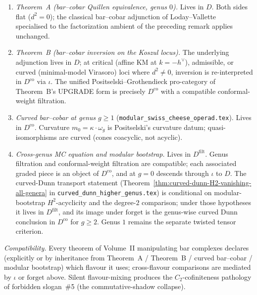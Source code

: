 \begin{remark}
\begin{enumerate}[label=\textup{(\roman*)}]
\item \emph{Theorem~A (bar--cobar Quillen equivalence, genus
 $0$).} Lives in $D$. Both sides flat ($d^2 = 0$); the classical
 bar--cobar adjunction of Loday--Vallette~\cite{LV12} specialised
 to the factorization ambient of the preceding remark applies
 unchanged.
\item \emph{Theorem~B (bar--cobar inversion on the Koszul
 locus).} The underlying adjunction lives in $D$; at critical
 (affine KM at $k = -h^\vee$), admissible, or curved
 (minimal-model Virasoro) loci where $d^2 \neq 0$, inversion is
 re-interpreted in $D^{\mathrm{co}}$ via $\iota$. The unified
 Positselski--Grothendieck pro-category of Theorem~B's UPGRADE
 form is precisely $D^{\mathrm{co}}$ with a compatible
 conformal-weight filtration.
\item \emph{Curved bar--cobar at genus $g \ge 1$}
 (\texttt{modular\_swiss\_cheese\_operad.tex}).
 Lives in $D^{\mathrm{co}}$. Curvature
 $m_0 = \kappa \cdot \omega_g$ is Positselski's curvature datum;
 quasi-isomorphisms are curved (cones coacyclic, not acyclic).
\item \emph{Cross-genus MC equation and modular bootstrap.} Lives
 in $D^{\mathrm{filt}}$. Genus filtration and conformal-weight
 filtration are compatible; each associated graded piece is an
 object of $D^{\mathrm{co}}$, and at $g = 0$ descends through
 $\iota$ to $D$. The curved-Dunn transport statement
 (Theorem~\ref*{thm:curved-dunn-H2-vanishing-all-genera} in
 \texttt{curved\_dunn\_higher\_genus.tex}) is conditional on
 modular-bootstrap \(H^2\)-acyclicity and the degree-\(2\)
 comparison; under those hypotheses it lives in
 $D^{\mathrm{filt}}$, and its image under $\mathrm{forget}$ is the
 genus-wise curved Dunn conclusion in $D^{\mathrm{co}}$ for
 \(g\ge2\). Genus \(1\) remains the separate twisted tensor
 criterion.
\end{enumerate}
\emph{Compatibility.} Every theorem of Volume~II manipulating bar
complexes declares (explicitly or by inheritance from Theorem~A /
Theorem~B / curved bar--cobar / modular bootstrap) which flavour
it uses; cross-flavour comparisons are mediated by $\iota$ or
$\mathrm{forget}$ above. Silent flavour-mixing produces the
$C_2$-cofiniteness pathology of forbidden slogan~\#5
\textup(the commutative-shadow collapse\textup).
\end{remark}

